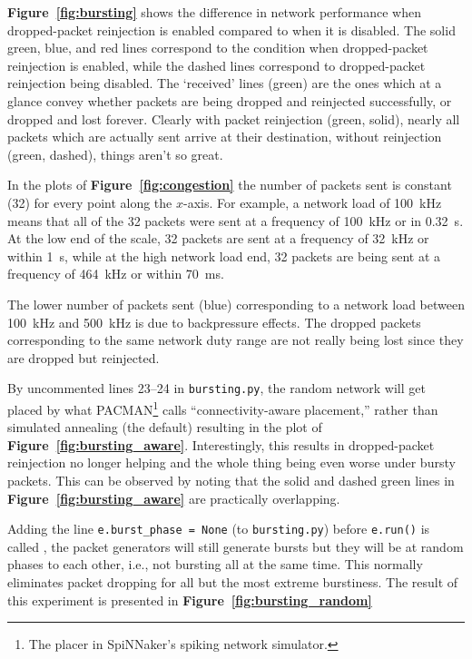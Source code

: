 \documentclass[oneside, a4paper, 11pt]{memoir}
\newlength\drop
\begin{document}
\textbf{Figure~\ref{fig:bursting}} shows the difference in network performance when dropped-packet reinjection is enabled compared to when it is disabled. The solid green, blue, and red lines correspond to the condition when dropped-packet reinjection is enabled, while the dashed lines correspond to dropped-packet reinjection being disabled. The `received' lines (green) are the ones which at a glance convey whether packets are being dropped and reinjected successfully, or dropped and lost forever. Clearly with packet reinjection (green, solid), nearly all packets which are actually sent arrive at their destination, without reinjection (green, dashed), things aren't so great. 

In the plots of \textbf{Figure~\ref{fig:congestion}} the number of packets sent is constant (32) for every point along the $x$-axis. For example, a network load of 100~kHz means that all of the 32 packets were sent at a frequency of 100~kHz or in 0.32~s. At the low end of the scale, 32 packets are sent at a frequency of 32~kHz or within 1~s, while at the high network load end, 32 packets are being sent at a frequency of 464~kHz or within 70~ms.

The lower number of packets sent (blue) corresponding to a network load between 100~kHz and 500~kHz is due to backpressure effects. The dropped packets corresponding to the same network duty range are not really being lost since they are dropped but reinjected.

By uncommented lines 23--24 in \verb|bursting.py|, the random network will get placed by what PACMAN\footnote{The placer in SpiNNaker's spiking network simulator.} calls ``connectivity-aware placement,'' rather than simulated annealing (the default) resulting in the plot of \textbf{Figure~\ref{fig:bursting_aware}}. Interestingly, this results in dropped-packet reinjection no longer helping and the whole thing being even worse under bursty packets. This can be observed by noting that the solid and dashed green lines in \textbf{Figure~\ref{fig:bursting_aware}} are practically overlapping.

Adding the line \verb|e.burst_phase = None| (to \verb|bursting.py|) before \verb|e.run()| is called , the packet generators will still generate bursts but they will be at random phases to each other, i.e., not bursting all at the same time. This normally eliminates packet dropping for all but the most extreme burstiness. The result of this experiment is presented in \textbf{Figure~\ref{fig:bursting_random}}
\end{document}
